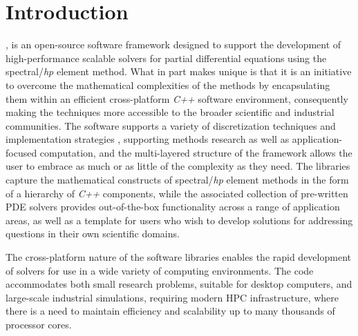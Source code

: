 \chapter{Introduction}

\nek{} \cite{CantwellMCBRMGYLEJXMENVBKS2015}, is an open-source software framework designed to support the development of 
high-performance scalable solvers for partial differential equations using the spectral/{\em hp\/} element method.   
What in part makes \nek{} unique is that it is  
an initiative to overcome the mathematical complexities of the methods by encapsulating them within an efficient cross-platform {\em C++} software environment, consequently making the techniques more accessible to the broader scientific and industrial communities. The software supports a variety of discretization techniques and 
implementation strategies \cite{VosSK2010,CantwellSKK2011a,CantwellSKK2011b,BolisCKS2014},
supporting methods research as well as application-focused computation, and the multi-layered structure of the framework allows the user to embrace as much or as little of the complexity as they need. The libraries capture the mathematical constructs of spectral/{\em hp\/} element methods in the form of a hierarchy of {\em C++} components, while the associated collection of pre-written PDE solvers provides out-of-the-box functionality across a range of application areas, as well as a template for users who wish to develop solutions for addressing questions in their own scientific domains.

The cross-platform nature of the software libraries enables the rapid development of solvers for use in a wide variety of computing environments. The code accommodates both small research problems, suitable for desktop computers, and large-scale industrial simulations, requiring modern HPC infrastructure, where there is a need to maintain efficiency and scalability up to many thousands of processor cores.

